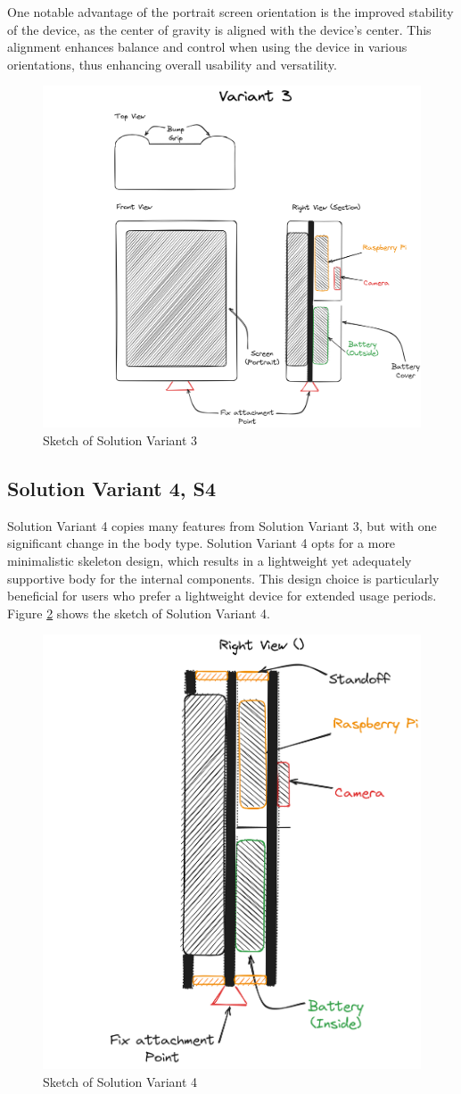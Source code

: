 One notable advantage of the portrait screen orientation is the improved stability of the device, as the center of gravity is aligned with the device's center. This alignment enhances balance and control when using the device in various orientations, thus enhancing overall usability and versatility.

\begin{figure}[H]
    \centering
    \includegraphics[width=0.75\linewidth]{texs/Part1/chapter3/image/v3.png}
    \caption{Sketch of Solution Variant 3}
    \label{fig:sketch-solution-variant-3}
\end{figure}

\subsection{Solution Variant 4, S4}
Solution Variant 4 copies many features from Solution Variant 3, but with one significant change in the body type. Solution Variant 4 opts for a more minimalistic skeleton design, which results in a lightweight yet adequately supportive body for the internal components. This design choice is particularly beneficial for users who prefer a lightweight device for extended usage periods. Figure \ref{fig:sketch-solution-variant-4} shows the sketch of Solution Variant 4.

\begin{figure}[H]
    \centering
    \includegraphics[width=0.5\linewidth]{texs/Part1/chapter3/image/v4.png}
    \caption{Sketch of Solution Variant 4}
    \label{fig:sketch-solution-variant-4}
\end{figure}

